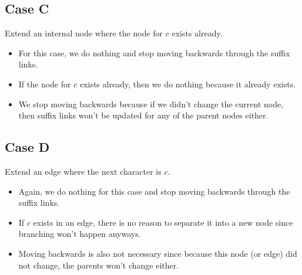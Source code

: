 \documentclass[10pt]{article}
\begin{document}
\subsection*{Case C}
Extend an internal node where the node for $c$ exists already.
\begin{itemize}
	\item For this case, we do nothing and stop moving backwards through the suffix links.
	\item If the node for $c$ exists already, then we do nothing because it already exists.
	\item We stop moving backwards because if we didn't change the current node, then suffix links won't be updated for any of the parent nodes either.
\end{itemize}

\subsection*{Case D}
Extend an edge where the next character is $c$.
\begin{itemize}
	\item Again, we do nothing for this case and stop moving backwards through the suffix links.
	\item If $c$ exists in an edge, there is no reason to separate it into a new node since branching won't happen anyways.
	\item Moving backwards is also not necessary since because this node (or edge) did not change, the parents won't change either.
\end{itemize}

\pagebreak
\end{document}
